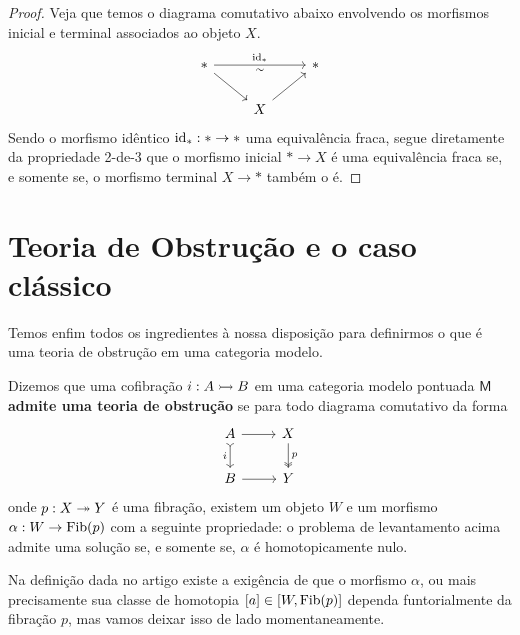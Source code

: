 \begin{proof}
  Veja que temos o diagrama comutativo abaixo envolvendo os morfismos inicial e terminal associados ao objeto $X$.
  \begin{displaymath}
    \begin{tikzcd}
      *
      \arrow[rr, "\id_{*}", "\sim" {swap}]
      \arrow[rd]
      & & *
      \\ & X
      \arrow[ru]
    \end{tikzcd}
  \end{displaymath}
  Sendo o morfismo idêntico $\mathrm{id}_{*}: * \to *$ uma equivalência fraca, segue diretamente da propriedade 2-de-3 que o morfismo inicial $* \to X$ é uma equivalência fraca se, e somente se, o morfismo terminal $X \to *$ também o é.
\end{proof}

\section{Teoria de Obstrução e o caso clássico}

Temos enfim todos os ingredientes à nossa disposição para definirmos o que é uma teoria de obstrução em uma categoria modelo.

\begin{defin}\label{defin:teoria_de_obstrucao_para_cofibracao}
  Dizemos que uma cofibração $i: A \rightarrowtail B$ em uma categoria modelo pontuada $\mathsf{M}$ \textbf{admite uma teoria de obstrução} se para todo diagrama comutativo da forma
  \begin{displaymath}
    \begin{tikzcd}
      A
      \arrow[d, tail, "i" swap]
      \arrow[r]
      & X
      \arrow[d, two heads, "p"]
      \\ B
      \arrow[r]
      & Y
    \end{tikzcd}
  \end{displaymath}
  onde $p: X \twoheadrightarrow Y$ é uma fibração, existem um objeto $W$ e um morfismo $\alpha: W \to \mathrm{Fib}(p)$ com a seguinte propriedade: o problema de levantamento acima admite uma solução se, e somente se, $\alpha$ é homotopicamente nulo.
\end{defin}

\begin{obs}
  Na definição dada no artigo existe a exigência de que o morfismo $\alpha$, ou mais precisamente sua classe de homotopia $[a] \in [W,\mathrm{Fib}(p)]$ dependa funtorialmente da fibração $p$, mas vamos deixar isso de lado momentaneamente.
\end{obs}

